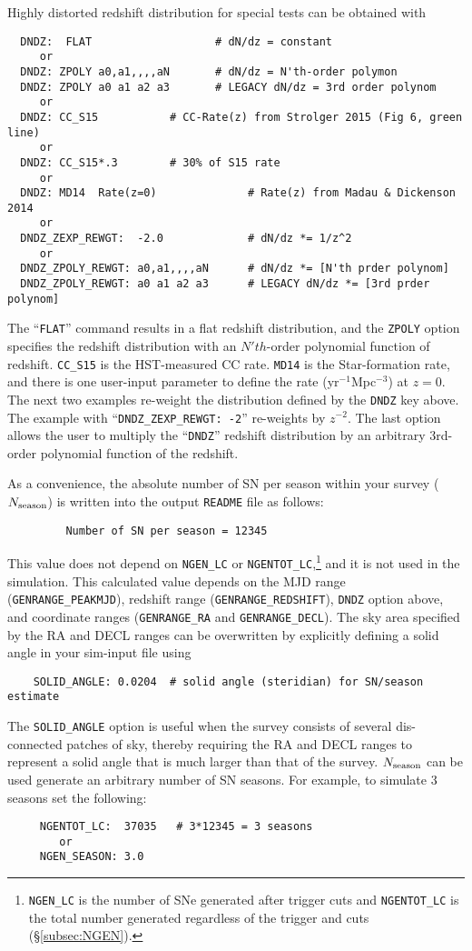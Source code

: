 \documentclass[12pt]{article}
\newcommand{\Nseason}{N_{\rm season}}
\begin{document}
Highly distorted redshift distribution for special tests
can be obtained with
%
\begin{verbatim}
  DNDZ:  FLAT                   # dN/dz = constant
     or
  DNDZ: ZPOLY a0,a1,,,,aN       # dN/dz = N'th-order polymon
  DNDZ: ZPOLY a0 a1 a2 a3       # LEGACY dN/dz = 3rd order polynom
     or
  DNDZ: CC_S15           # CC-Rate(z) from Strolger 2015 (Fig 6, green line)
     or
  DNDZ: CC_S15*.3        # 30% of S15 rate
     or
  DNDZ: MD14  Rate(z=0)              # Rate(z) from Madau & Dickenson 2014  
     or
  DNDZ_ZEXP_REWGT:  -2.0             # dN/dz *= 1/z^2
     or
  DNDZ_ZPOLY_REWGT: a0,a1,,,,aN      # dN/dz *= [N'th prder polynom]
  DNDZ_ZPOLY_REWGT: a0 a1 a2 a3      # LEGACY dN/dz *= [3rd prder polynom]
\end{verbatim}
%
The ``{\tt FLAT}'' command results in a flat redshift distribution,
and the {\tt ZPOLY} option specifies the redshift distribution with
an $N'th$-order polynomial function of redshift.
{\tt CC\_S15} is the HST-measured CC rate.
{\tt MD14} is the Star-formation rate, and there is one user-input 
parameter to define the rate (yr$^{-1}$Mpc$^{-3}$) at $z=0$.
The next two examples re-weight the distribution defined
by the {\tt DNDZ} key above.
The example with ``{\tt DNDZ\_ZEXP\_REWGT: -2}'' re-weights
by $z^{-2}$.
The last option allows the user to multiply the ``{\tt DNDZ}''
redshift distribution by an arbitrary 3rd-order polynomial
function of the redshift.

As a convenience, the absolute number of SN per season within your survey
($\Nseason$) is written into the output {\tt README} file as follows:
%
\begin{verbatim}
         Number of SN per season = 12345
\end{verbatim}
%
This value does not depend on 
{\tt NGEN\_LC} or {\tt NGENTOT\_LC},\footnote{
{\tt NGEN\_LC} is the number of SNe generated after trigger cuts and
{\tt NGENTOT\_LC} is the total number generated regardless of the
trigger and cuts (\S\ref{subsec:NGEN}).
} %
and it is not used in the simulation.
This calculated value depends on the
MJD range ({\tt GENRANGE\_PEAKMJD}),
redshift range ({\tt GENRANGE\_REDSHIFT}),
{\tt DNDZ} option above,
and coordinate ranges ({\tt GENRANGE\_RA} and {\tt GENRANGE\_DECL}).
The sky area specified by the RA and DECL ranges can be overwritten
by explicitly defining a solid angle in your sim-input file using
\begin{verbatim}
    SOLID_ANGLE: 0.0204  # solid angle (steridian) for SN/season estimate
\end{verbatim}
The {\tt SOLID\_ANGLE} option is useful when the survey consists
of several dis-connected patches of sky, thereby requiring the
RA and DECL ranges to represent a solid  angle that is much larger
than that of the survey.
%
$\Nseason$ can be used generate an arbitrary number of SN seasons. 
For example, to simulate 3 seasons set the following:
\begin{verbatim}
     NGENTOT_LC:  37035   # 3*12345 = 3 seasons
        or
     NGEN_SEASON: 3.0
\end{verbatim}
\end{document}
